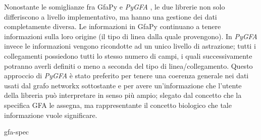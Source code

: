 \documentclass[11pt, a4paper]{book}
\newcommand {\pygfa} {\textit{PyGFA }}
\begin{document}
Nonostante le somiglianze fra GfaPy e \pygfa, le due librerie non solo differiscono
a livello implementativo, ma hanno una gestione dei dati completamente diversa.
Le informazioni in GfaPy continuano a tenere informazioni sulla loro origine (il tipo
di linea dalla quale provengono). In \pygfa invece le informazioni vengono	
ricondotte ad un unico livello di astrazione; tutti i collegamenti possiedono tutti
lo stesso numero di campi, i quali successivamente potranno averli definiti o meno
a seconda del tipo di linea/collegamento. Questo approccio di \pygfa è stato
preferito per tenere una coerenza generale nei dati usati dal grafo networkx
sottostante e per avere un'informazione che l'utente della libreria può interpretare
in senso più ampio; slegato dal concetto che la specifica GFA le assegna, ma
rappresentante il concetto biologico che tale informazione vuole significare.



 {gfa-spec}



\printbibliography

\listoftodos[TODO]
\end{document}
